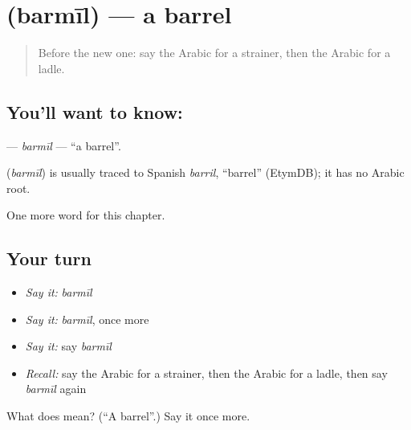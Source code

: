 \section[\texorpdfstring{\ar{برميل} (barmīl)}{برميل (barmīl)}]{ (barmīl) — a barrel}

\label{lesson:AR-C278-barmil}



\begin{quote}
Before the new one: say the Arabic for a strainer, then the Arabic for a ladle.
\end{quote}

\subsection*{You'll want to know: }
\textbf{} — \emph{barmīl} — \textquotedblleft{}a barrel\textquotedblright{}.

\begin{cousinweb}
\textbf{} (\emph{barmīl}) is usually traced to Spanish \emph{barril}, \textquotedblleft{}barrel\textquotedblright{} (EtymDB); it has no Arabic root.
\end{cousinweb}

\begin{grammarlens}[title={What you've built}]
One more word for this chapter.
\end{grammarlens}

\subsection*{Your turn}
\begin{itemize}
\raggedright
  \item \emph{Say it:} \emph{barmīl}
  \item \emph{Say it:} \emph{barmīl}, once more
  \item \emph{Say it:} say \emph{barmīl}
  \item \emph{Recall:} say the Arabic for a strainer, then the Arabic for a ladle, then say \emph{barmīl} again
\end{itemize}

\begin{tcolorbox}[breakable,colback=teal!4,colframe=teal!35!black,title={Before you move on}]
What does  mean? (\textquotedblleft{}A barrel\textquotedblright{}.) Say it once more.
\end{tcolorbox}
